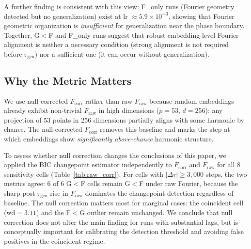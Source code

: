 \documentclass{article}
\newcommand{\taug}{\tau_{\mathrm{gen}}}
\newcommand{\Dtau}{\Delta\tau}
\newcommand{\fcorr}{F_{\mathrm{corr}}}
\begin{document}
A further finding is consistent with this view: F\_only runs
(Fourier geometry detected but no generalization) exist at lr
$\approx5.9\times10^{-3}$, showing that Fourier geometric
organization is \emph{insufficient} for generalization near the phase
boundary.
Together, G$<$F and F\_only runs suggest that robust embedding-level
Fourier alignment is neither a necessary condition (strong alignment
is not required before $\taug$) nor a sufficient one (it can occur
without generalization).

\subsection{Why the Metric Matters}

We use null-corrected $\fcorr$ rather than raw $F_{\mathrm{raw}}$
because random embeddings already exhibit non-trivial $F_{\mathrm{raw}}$
in high dimensions ($p=53$, $d=256$): any projection of 53 points in
256 dimensions partially aligns with some harmonic by chance.
The null-corrected $\fcorr$ removes this baseline and marks the step
at which embeddings show \emph{significantly above-chance} harmonic
structure.

To assess whether null correction changes the conclusions of this paper,
we applied the BIC changepoint estimator independently to $\fcorr$ and
$F_{\mathrm{raw}}$ for all 8 sensitivity cells (Table~\ref{tab:raw_corr}).
For cells with $|\Dtau|\geq3{,}000$ steps, the two metrics agree:
6 of 6 G$<$F cells remain G$<$F under raw Fourier, because the
sharp post-$\taug$ rise in $F_{\mathrm{raw}}$ dominates the changepoint
detection regardless of baseline.
The null correction matters most for marginal cases: the coincident
cell (wd$=3.11$) and the F$<$G outlier remain unchanged.
We conclude that null correction does not alter the main finding
for runs with substantial lags, but is conceptually important for
calibrating the detection threshold and avoiding false positives in
the coincident regime.
\end{document}
